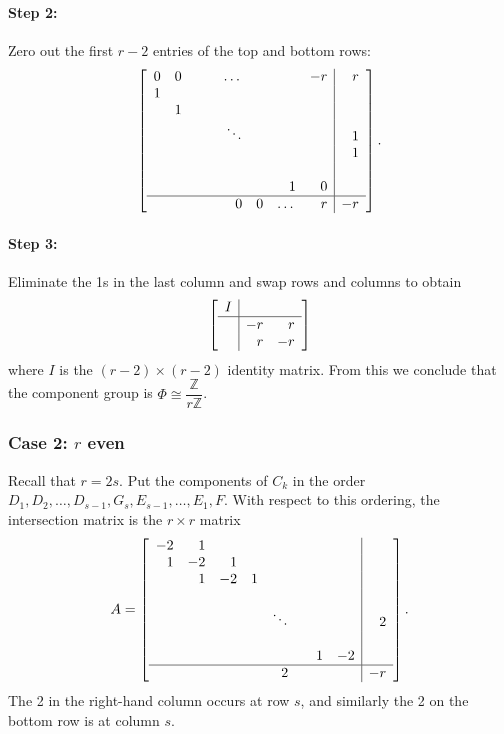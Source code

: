 \documentclass[reqno]{amsart}
\theoremstyle{definition}
\theoremstyle{remark}
\def\Z{\mathbb{Z}}
\def\isom{\cong}
\begin{document}
\paragraph{Step 2:}
\label{sec:step-2-odd}

Zero out the first $r-2$ entries of the top and bottom rows:
\[
\left[\begin{array}{rrrrrrrr|r}
  0 & 0 & & & \dots & & & -r & r \\
  1 & & & & & & & & \\
  & 1 & & & & & & & \\
  & & & & \ddots & & & & 1 \\
  & & & &  & & & & 1 \\
  & & & &  & & & & \\
  & & & & & & 1 & 0 & \\ \hline
  & & & & 0 & 0 & \dots & r & -r
\end{array}\right].
\]

\paragraph{Step 3:}
\label{sec:step-3-odd}

Eliminate the 1s in the last column and swap rows and columns to obtain
\[
\left[\begin{array}{c|rr}
  I & & \\ \hline
 & -r & r \\
& r & -r
\end{array}\right]
\]
where $I$ is the $(r-2) \times (r-2)$ identity matrix. From this we conclude that the component group is $\Phi \isom \dfrac{\Z}{r\Z}$.

\subsubsection{Case 2: $r$ even}
\label{sec:case-2:-r-even}

Recall that $r = 2s$. Put the components of $C_k$ in the order $D_1, D_2, \dots, D_{s-1}, G_s, E_{s-1}, \dots, E_1, F$. With respect to this ordering, the intersection matrix is the $r \times r$ matrix
\[
A = \left[\begin{array}{rrrrrrrr|r}
  -2 & 1 & & & & & & & \\
  1 & -2 & 1 & & & & & & \\
  & 1 & -2 & 1 & & & & & \\
  & & & & & & & & \\
  & & & & \ddots & & & & 2 \\
  & & & & & & & & \\
  & & & & & & 1 & -2 & \\ \hline
  & & & & 2 &  & & & -r
\end{array}\right].
\]
The 2 in the right-hand column occurs at row $s$, and similarly the 2 on the bottom row is at column $s$.
\end{document}
